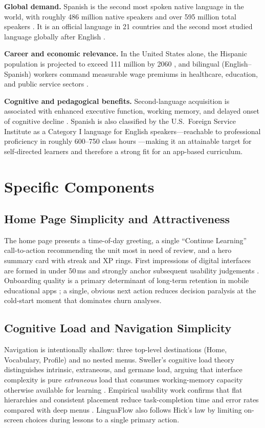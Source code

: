 \documentclass[11pt,a4paper]{article}
\begin{document}
\textbf{Global demand.} Spanish is the second most spoken native language in the world, with roughly 486 million native speakers and over 595 million total speakers \cite{ethnologue2023}. It is an official language in 21 countries and the second most studied language globally after English \cite{instituto2023espanol}.

\textbf{Career and economic relevance.} In the United States alone, the Hispanic population is projected to exceed 111 million by 2060 \cite{uscensus2020}, and bilingual (English--Spanish) workers command measurable wage premiums in healthcare, education, and public service sectors \cite{agirdag2014economic}.

\textbf{Cognitive and pedagogical benefits.} Second-language acquisition is associated with enhanced executive function, working memory, and delayed onset of cognitive decline \cite{bialystok2012bilingualism}. Spanish is also classified by the U.S.\ Foreign Service Institute as a Category I language for English speakers—reachable to professional proficiency in roughly 600--750 class hours \cite{fsi2018}—making it an attainable target for self-directed learners and therefore a strong fit for an app-based curriculum.

\section{Specific Components}

\subsection{Home Page Simplicity and Attractiveness}
The home page presents a time-of-day greeting, a single ``Continue Learning'' call-to-action recommending the unit most in need of review, and a hero summary card with streak and XP rings. First impressions of digital interfaces are formed in under 50\,ms and strongly anchor subsequent usability judgements \cite{lindgaard2006attention}. Onboarding quality is a primary determinant of long-term retention in mobile educational apps \cite{loewen2019duolingo}; a single, obvious next action reduces decision paralysis at the cold-start moment that dominates churn analyses.

\subsection{Cognitive Load and Navigation Simplicity}
Navigation is intentionally shallow: three top-level destinations (Home, Vocabulary, Profile) and no nested menus. Sweller's cognitive load theory distinguishes intrinsic, extraneous, and germane load, arguing that interface complexity is pure \emph{extraneous} load that consumes working-memory capacity otherwise available for learning \cite{sweller1988cognitive,sweller2011cognitive}. Empirical usability work confirms that flat hierarchies and consistent placement reduce task-completion time and error rates compared with deep menus \cite{nielsen1994usability,larson1998web}. LinguaFlow also follows Hick's law by limiting on-screen choices during lessons to a single primary action.
\end{document}
